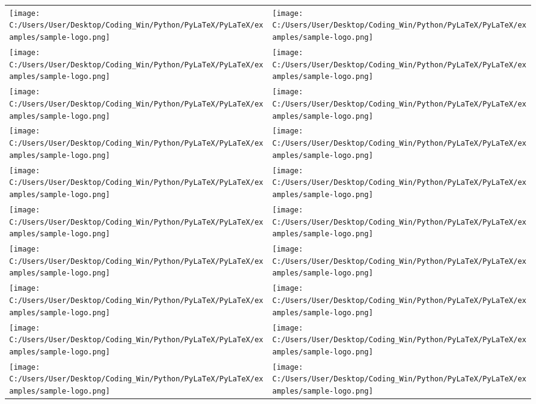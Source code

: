 \documentclass{article}%
\begin{document}
\begin{longtabu}{X[c] X[c]}
\texttt{[image: C:/Users/User/Desktop/Coding\_Win/Python/PyLaTeX/PyLaTeX/examples/sample-logo.png]}&\texttt{[image: C:/Users/User/Desktop/Coding\_Win/Python/PyLaTeX/PyLaTeX/examples/sample-logo.png]}\\%
\texttt{[image: C:/Users/User/Desktop/Coding\_Win/Python/PyLaTeX/PyLaTeX/examples/sample-logo.png]}&\texttt{[image: C:/Users/User/Desktop/Coding\_Win/Python/PyLaTeX/PyLaTeX/examples/sample-logo.png]}\\%
\texttt{[image: C:/Users/User/Desktop/Coding\_Win/Python/PyLaTeX/PyLaTeX/examples/sample-logo.png]}&\texttt{[image: C:/Users/User/Desktop/Coding\_Win/Python/PyLaTeX/PyLaTeX/examples/sample-logo.png]}\\%
\texttt{[image: C:/Users/User/Desktop/Coding\_Win/Python/PyLaTeX/PyLaTeX/examples/sample-logo.png]}&\texttt{[image: C:/Users/User/Desktop/Coding\_Win/Python/PyLaTeX/PyLaTeX/examples/sample-logo.png]}\\%
\texttt{[image: C:/Users/User/Desktop/Coding\_Win/Python/PyLaTeX/PyLaTeX/examples/sample-logo.png]}&\texttt{[image: C:/Users/User/Desktop/Coding\_Win/Python/PyLaTeX/PyLaTeX/examples/sample-logo.png]}\\%
\texttt{[image: C:/Users/User/Desktop/Coding\_Win/Python/PyLaTeX/PyLaTeX/examples/sample-logo.png]}&\texttt{[image: C:/Users/User/Desktop/Coding\_Win/Python/PyLaTeX/PyLaTeX/examples/sample-logo.png]}\\%
\texttt{[image: C:/Users/User/Desktop/Coding\_Win/Python/PyLaTeX/PyLaTeX/examples/sample-logo.png]}&\texttt{[image: C:/Users/User/Desktop/Coding\_Win/Python/PyLaTeX/PyLaTeX/examples/sample-logo.png]}\\%
\texttt{[image: C:/Users/User/Desktop/Coding\_Win/Python/PyLaTeX/PyLaTeX/examples/sample-logo.png]}&\texttt{[image: C:/Users/User/Desktop/Coding\_Win/Python/PyLaTeX/PyLaTeX/examples/sample-logo.png]}\\%
\texttt{[image: C:/Users/User/Desktop/Coding\_Win/Python/PyLaTeX/PyLaTeX/examples/sample-logo.png]}&\texttt{[image: C:/Users/User/Desktop/Coding\_Win/Python/PyLaTeX/PyLaTeX/examples/sample-logo.png]}\\%
\texttt{[image: C:/Users/User/Desktop/Coding\_Win/Python/PyLaTeX/PyLaTeX/examples/sample-logo.png]}&\texttt{[image: C:/Users/User/Desktop/Coding\_Win/Python/PyLaTeX/PyLaTeX/examples/sample-logo.png]}\\%

\end{longtabu}
\end{document}

